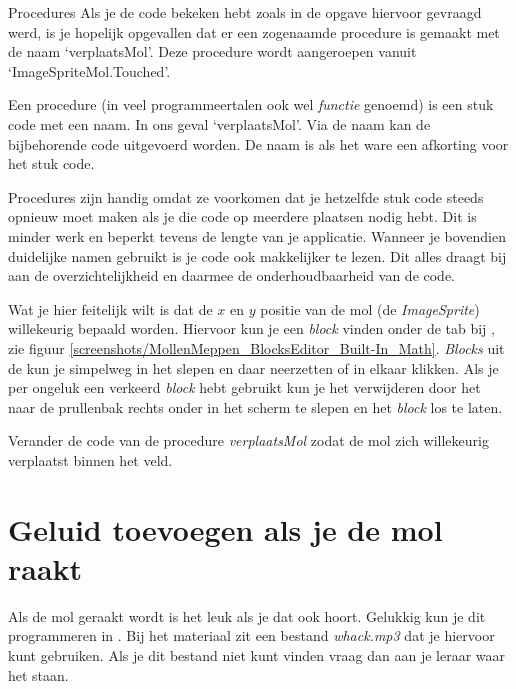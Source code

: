 \begin{derivation}{Procedures}
\label{der:procedures}
Als je de code bekeken hebt zoals in de opgave hiervoor gevraagd werd, is je hopelijk opgevallen dat er een zogenaamde procedure is gemaakt met de naam `verplaatsMol'. Deze procedure wordt aangeroepen vanuit `ImageSpriteMol.Touched'.

Een procedure (in veel programmeertalen ook wel \emph{functie} genoemd) is een stuk code met een naam. In ons geval `verplaatsMol'. Via de naam kan de bijbehorende code uitgevoerd worden. De naam is als het ware een afkorting voor het stuk code.

Procedures zijn handig omdat ze voorkomen dat je hetzelfde stuk code steeds opnieuw moet maken als je die code op meerdere plaatsen nodig hebt. Dit is minder werk en beperkt tevens de lengte van je applicatie. Wanneer je bovendien duidelijke namen gebruikt is je code ook makkelijker te lezen. Dit alles draagt bij aan de overzichtelijkheid en daarmee de onderhoudbaarheid van de code.
\end{derivation}

Wat je hier feitelijk wilt is dat de $x$ en $y$ positie van de mol (de \emph{ImageSprite}) willekeurig bepaald worden. Hiervoor kun je een \emph{block} vinden onder de  tab bij , zie figuur \ref{screenshots/MollenMeppen_BlocksEditor_Built-In_Math}. \emph{Blocks} uit de  kun je simpelweg in het  slepen en daar neerzetten of in elkaar klikken. Als je per ongeluk een verkeerd \emph{block} hebt gebruikt kun je het verwijderen door het naar de prullenbak rechts onder in het scherm te slepen en het \emph{block} los te laten.


\begin{opgave}
    \opgVraag
	Verander de code van de procedure \emph{verplaatsMol} zodat de mol zich willekeurig verplaatst binnen het veld.
\end{opgave}


\section{Geluid toevoegen als je de mol raakt}
Als de mol geraakt wordt is het leuk als je dat ook hoort. Gelukkig kun je dit programmeren in \ai. Bij het materiaal zit een bestand \emph{whack.mp3} dat je hiervoor kunt gebruiken. Als je dit bestand niet kunt vinden vraag dan aan je leraar waar het staan.

